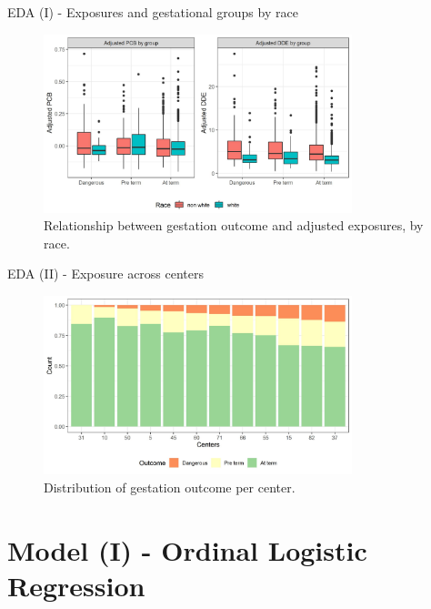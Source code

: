 \documentclass{beamer}
\begin{document}
	\begin{frame}{EDA (I) - Exposures and gestational groups by race}
	
	\begin{figure}
		\centering
		\includegraphics[width=0.8\textwidth]{pcb_dde_per_gest.jpeg}
		\caption{Relationship between gestation outcome and adjusted exposures, by race.}
		\label{fig:p1}
	\end{figure}
\end{frame}

\begin{frame}{EDA (II) - Exposure across centers}

	\begin{figure}
	\centering
	\includegraphics[width=0.8\textwidth]{outcome_per_center.jpeg}
	\caption{Distribution of gestation outcome per center.}
	\label{fig:p1}
\end{figure}

\end{frame}



\section{Model (I) - Ordinal Logistic Regression}
\end{document}

